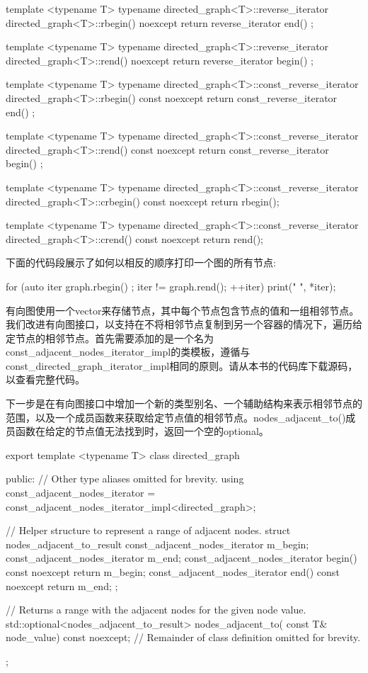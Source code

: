 \begin{cpp}
template <typename T>
typename directed_graph<T>::reverse_iterator
    directed_graph<T>::rbegin() noexcept { return reverse_iterator { end() }; }

template <typename T>
typename directed_graph<T>::reverse_iterator
    directed_graph<T>::rend() noexcept { return reverse_iterator { begin() }; }

template <typename T>
typename directed_graph<T>::const_reverse_iterator
    directed_graph<T>::rbegin() const noexcept
{ return const_reverse_iterator { end() }; }

template <typename T>
typename directed_graph<T>::const_reverse_iterator
    directed_graph<T>::rend() const noexcept
{ return const_reverse_iterator { begin() }; }

template <typename T>
typename directed_graph<T>::const_reverse_iterator
    directed_graph<T>::crbegin() const noexcept { return rbegin(); }

template <typename T>
typename directed_graph<T>::const_reverse_iterator
    directed_graph<T>::crend() const noexcept { return rend(); }
\end{cpp}

下面的代码段展示了如何以相反的顺序打印一个图的所有节点:

\begin{cpp}
for (auto iter { graph.rbegin() }; iter != graph.rend(); ++iter) {
    print("{} ", *iter);
}
\end{cpp}


有向图使用一个vector来存储节点，其中每个节点包含节点的值和一组相邻节点。我们改进有向图接口，以支持在不将相邻节点复制到另一个容器的情况下，遍历给定节点的相邻节点。首先需要添加的是一个名为const\_adjacent\_nodes\_iterator\_impl的类模板，遵循与const\_directed\_graph\_iterator\_impl相同的原则。请从本书的代码库下载源码，以查看完整代码。

下一步是在有向图接口中增加一个新的类型别名、一个辅助结构来表示相邻节点的范围，以及一个成员函数来获取给定节点值的相邻节点。nodes\_adjacent\_to()成员函数在给定的节点值无法找到时，返回一个空的optional。

\begin{cpp}
export template <typename T>
class directed_graph
{
    public:
        // Other type aliases omitted for brevity.
        using const_adjacent_nodes_iterator =
            const_adjacent_nodes_iterator_impl<directed_graph>;

        // Helper structure to represent a range of adjacent nodes.
        struct nodes_adjacent_to_result
        {
            const_adjacent_nodes_iterator m_begin;
            const_adjacent_nodes_iterator m_end;
            const_adjacent_nodes_iterator begin() const noexcept{ return m_begin; }
            const_adjacent_nodes_iterator end() const noexcept { return m_end; }
        };

        // Returns a range with the adjacent nodes for the given node value.
        std::optional<nodes_adjacent_to_result> nodes_adjacent_to(
            const T& node_value) const noexcept;
        // Remainder of class definition omitted for brevity.
};
\end{cpp}

